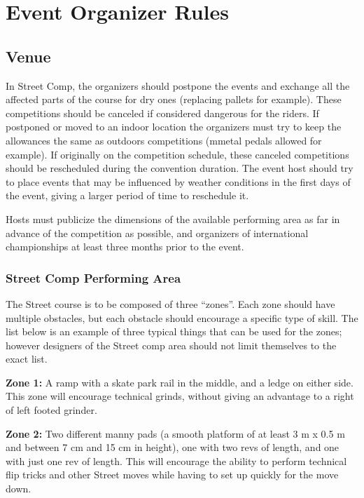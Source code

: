 \chapter{Event Organizer Rules}

\section{Venue}

In Street Comp, the organizers should postpone the events and exchange all the affected parts of the course for dry ones (replacing pallets for example).
These competitions should be canceled if considered dangerous for the riders.
If postponed or moved to an indoor location the organizers must try to keep the allowances the same as outdoors competitions (mmetal pedals allowed for example).
If originally on the competition schedule, these canceled competitions should be rescheduled during the convention duration.
The event host should try to place events that may be influenced by weather conditions in the first days of the event, giving a larger period of time to reschedule it.

Hosts must publicize the dimensions of the available performing area as far in advance of the competition as possible, and organizers of international championships at least three months prior to the event. 

\subsection{Street Comp Performing Area \label{sec:flat-street_street-performing-area}}
The Street course is to be composed of three ``zones''.
Each zone should have multiple obstacles, but each obstacle should encourage a specific type of skill.
The list below is an example of three typical things that can be used for the zones; however designers of the Street comp area should not limit themselves to the exact list.

\textbf{Zone 1:}
A ramp with a skate park rail in the middle, and a ledge on either side.
This zone will encourage technical grinds, without giving an advantage to a right of left footed grinder.

\textbf{Zone 2:}
Two different manny pads (a smooth platform of at least 3 m x 0.5 m and between 7 cm and 15 cm in height), one with two revs of length, and one with just one rev of length.
This will encourage the ability to perform technical flip tricks and other Street moves while having to set up quickly for the move down.

